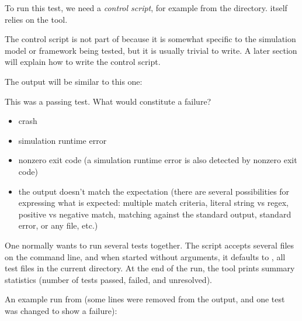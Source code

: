 To run this test, we need a \textit{control script}, for example
 from the  directory. 
itself relies on the  tool.

\begin{note}
The control script is not part of {\opp} because it is somewhat specific to
the simulation model or framework being tested, but it is usually trivial
to write. A later section will explain how to write the control script.
\end{note}

The output will be similar to this one:


This was a passing test. What would constitute a failure?

\begin{itemize}
\item crash
\item simulation runtime error
\item nonzero exit code (a simulation runtime error is also detected by nonzero exit code)
\item the output doesn't match the expectation (there are several possibilities
   for expressing what is expected: multiple match criteria, literal string vs regex,
   positive vs negative match, matching against the standard output, standard error,
   or any file, etc.)
\end{itemize}

One normally wants to run several tests together. The  script accepts
several  files on the command line, and when started without
arguments, it defaults to , all test files in the current
directory. At the end of the run, the tool prints summary statistics
(number of tests passed, failed, and unresolved).

An example run from  (some lines were removed from
the output, and one test was changed to show a failure):

